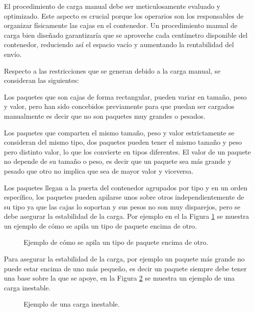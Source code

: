 \documentclass[openany]{article}
\begin{document}
El procedimiento de carga manual debe ser meticulosamente evaluado y optimizado. Este aspecto es crucial porque los operarios son los responsables de organizar físicamente las cajas en el contenedor. Un procedimiento manual de carga bien diseñado garantizaría que se aproveche cada centímetro disponible del contenedor, reduciendo así el espacio vacío y aumentando la rentabilidad del envío.

Respecto a las restricciones que se generan debido a la carga manual, se consideran las siguientes:

Los paquetes que son cajas de forma rectangular, pueden variar en tamaño, peso y valor, pero han sido concebidos previamente para que puedan ser cargados manualmente es decir que no son paquetes muy grandes o pesados.

Los paquetes que comparten el mismo tamaño, peso y valor estrictamente se consideran del mismo tipo, dos paquetes pueden tener el mismo tamaño y peso pero distinto valor, lo que los convierte en tipos diferentes. El valor de un paquete no depende de su tamaño o peso, es decir que un paquete sea más grande y pesado que otro no implica que sea de mayor valor y viceversa.

Los paquetes llegan a la puerta del contenedor agrupados por tipo y en un orden específico, los paquetes pueden apilarse unos sobre otros independientemente de su tipo ya que las cajas lo soportan y sus pesos no son muy disparejos, pero se debe asegurar la estabilidad de la carga. Por ejemplo en el la Figura \ref{fig:paquetes_apilados} se muestra un ejemplo de cómo se apila un tipo de paquete encima de otro.

\begin{figure}[H]
    \centering
    
    \caption{Ejemplo de cómo se apila un tipo de paquete encima de otro.}
    \label{fig:paquetes_apilados}
\end{figure}

Para asegurar la estabilidad de la carga, por ejemplo un paquete más grande no puede estar encima de uno más pequeño, es decir un paquete siempre debe tener una base sobre la que se apoye, en la Figura \ref{fig:paquetes_mal_apilados} se muestra un ejemplo de una carga inestable.

\begin{figure}[H]
    \centering
    
    \caption{Ejemplo de una carga inestable.}
    \label{fig:paquetes_mal_apilados}
\end{figure}
\end{document}
